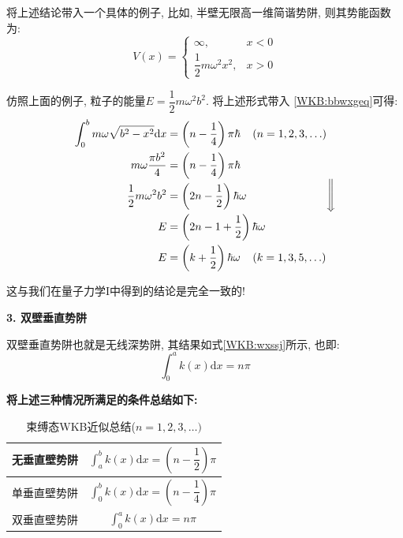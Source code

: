 \documentclass[a4paper, 11pt]{article}
\begin{document}
\begin{spacing}{1.2}
        将上述结论带入一个具体的例子, 比如, 半壁无限高一维简谐势阱, 则其势能函数为:
        \begin{equation}
          V(x) = 
          \left\{\begin{array}{ll}
            \infty, & x<0\\
            \dfrac{1}{2}m\omega^2x^2, & x>0
          \end{array}\right.
        \end{equation}

        仿照上面的例子, 粒子的能量$E=\dfrac{1}{2}m\omega^2b^2$. 将上述形式带入
        \eqref{WKB:bbwxgeq}可得:
        \begin{equation}
          \begin{aligned}
            \int_0^bm\omega\sqrt{b^2-x^2}\mathrm{d}x &= \left(n-\dfrac{1}{4}\right)\pi\hbar\;\;\;\;(n=1,2,3,\ldots)\\
            m\omega\dfrac{\pi{}b^2}{4} &= \left(n-\dfrac{1}{4}\right)\pi\hbar\\
            \dfrac{1}{2}m\omega^2b^2 &= \left(2n-\dfrac{1}{2}\right)\hbar\omega\\
            E &= \left(2n-1+\dfrac{1}{2}\right)\hbar\omega\\
            E &= \left(k +\dfrac{1}{2}\right)\hbar\omega \;\;\;\;(k=1,3,5,\ldots)
          \end{aligned}\Bigg\Downarrow
        \end{equation}

        这与我们在量子力学I中得到的结论是完全一致的!

        \textbf{3. 双壁垂直势阱}

        双壁垂直势阱也就是无线深势阱, 其结果如式\eqref{WKB:wxssj}所示, 也即:
        \begin{equation}
          \int_0^ak(x)\mathrm{d}x = n\pi
        \end{equation}

        \textbf{将上述三种情况所满足的条件总结如下:}
        
        \begin{table}[H]
          \centering
          \begin{spacing}{2.5}
          \caption{束缚态WKB近似总结($n=1,2,3,\ldots)$}
          \begin{tabular}{c|c}
            \toprule
            无垂直壁势阱 &  $\int_a^bk(x)\mathrm{d}x= \left(n-\dfrac{1}{2}\right)\pi$\\
            \hline
            单垂直壁势阱 &  $\int_0^bk(x)\mathrm{d}x = \left(n-\dfrac{1}{4}\right)\pi$\\
            \hline
            双垂直壁势阱 &  $\int_0^ak(x)\mathrm{d}x = n\pi$\\
            \bottomrule 
          \end{tabular} 
          \end{spacing}
        \end{table}


\end{spacing}
\end{document}
